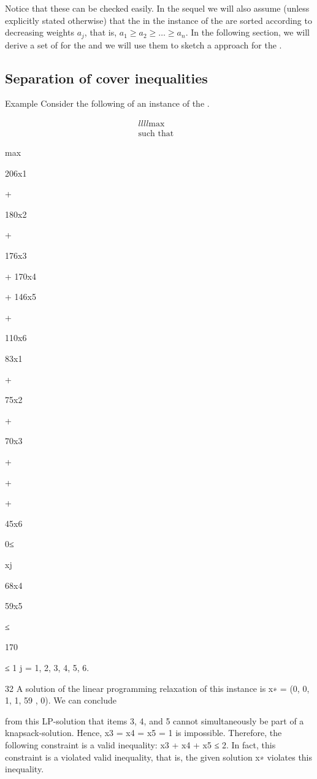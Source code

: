 \begin{note}
Notice that these  can be checked easily. In the sequel we will also assume (unless explicitly stated otherwise) that the  in the instance of the  are sorted according to decreasing weights $a_j$, that is, $a_1\geq a_2\geq\ldots\geq a_n$. In the following section, we will derive a set of  for the  and we will use them to sketch a  approach for the .
\end{note}

\subsection{Separation of cover inequalities}

\begin{example}
Example Consider the following  of an instance of the .

\begin{align}{llll}
\mbox{max}&\\
\mbox{such that}&
\end{align}

max

206x1

+

180x2

+

176x3

+ 170x4

+ 146x5

+

110x6

83x1

+

75x2

+

70x3

+

+

+

45x6

0≤

xj

68x4

59x5

≤

170

≤ 1 j = 1, 2, 3, 4, 5, 6.

32
A solution of the linear programming relaxation of this instance is x∗ = (0, 0, 1, 1, 59
, 0). We can conclude

from this LP-solution that items 3, 4, and 5 cannot simultaneously be part of a knapsack-solution. Hence,
x3 = x4 = x5 = 1 is impossible. Therefore, the following constraint is a valid inequality:
x3 + x4 + x5 ≤ 2.
In fact, this constraint is a violated valid inequality, that is, the given solution x∗ violates this inequality.
\end{example}

